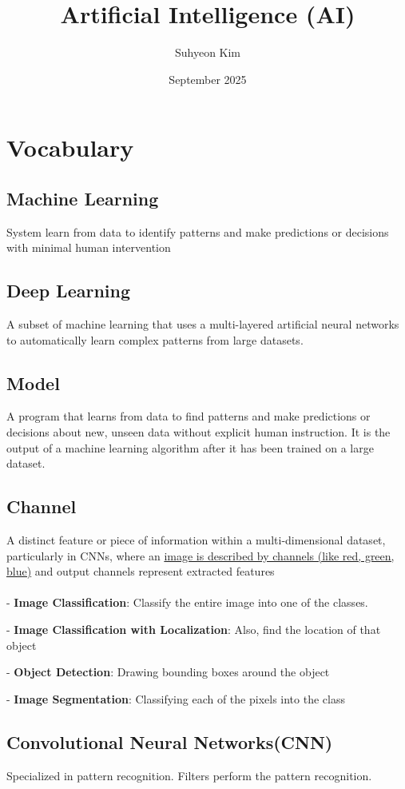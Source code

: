 \documentclass{article}
\title{Artificial Intelligence (AI)}
\author{Suhyeon Kim}
\date{September 2025}
\begin{document}
\maketitle

\section{Vocabulary}
\subsection{Machine Learning}
System learn from data to identify patterns and make predictions or decisions with minimal human intervention

\subsection{Deep Learning}
A subset of machine learning that uses a multi-layered artificial neural networks to automatically learn complex patterns from large datasets. 

\subsection{Model}
A program that learns from data to find patterns and make predictions or decisions about new, unseen data without explicit human instruction. It is the output of a machine learning algorithm after it has been trained on a large dataset. 

\subsection{Channel}
A distinct feature or piece of information within a multi-dimensional dataset, particularly in CNNs, where an \underline{image is described by channels (like red, green, blue)} and output channels represent extracted features
\\
\\
- \textbf{Image Classification}: Classify the entire image into one of the classes. 

\noindent - \textbf{Image Classification with Localization}: Also, find the location of that object 

\noindent - \textbf{Object Detection}: Drawing bounding boxes around the object

\noindent - \textbf{Image Segmentation}: Classifying each of the pixels into the class

\subsection{Convolutional Neural Networks(CNN)}
Specialized in pattern recognition. Filters perform the pattern recognition. 
\end{document}
